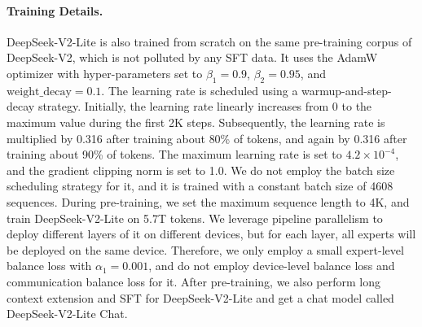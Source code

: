 \documentclass[11pt, a4paper, logo, copyright, nonumbering]{deepseek}
\newcommand{\dsvii}{DeepSeek-V2}
\newcommand{\dsviilite}{DeepSeek-V2-Lite}
\begin{document}
\begin{CJK*}{UTF8}{gbsn}
\paragraph{Training Details.}
\dsviilite{} is also trained from scratch on the same pre-training corpus of \dsvii{}, which is not polluted by any SFT data. 
It uses the AdamW optimizer with hyper-parameters set to $\beta_1=0.9$, $\beta_2=0.95$, and $\mathrm{weight\_decay}=0.1$. 
The learning rate is scheduled using a warmup-and-step-decay strategy. 
Initially, the learning rate linearly increases from 0 to the maximum value during the first 2K steps. 
Subsequently, the learning rate is multiplied by 0.316 after 
training about 80\% of tokens, and again by 0.316 after training about 90\% of tokens. 
The maximum learning rate is set to $4.2 \times 10^{-4}$, and the gradient clipping norm is set to 1.0.
We do not employ the batch size scheduling strategy for it, and it is trained with a constant batch size of 4608 sequences. 
During pre-training, we set the maximum sequence length to 4K, and train \dsviilite{} on 5.7T tokens. 
We leverage pipeline parallelism to deploy different layers of it on different devices, but for each layer, all experts will be deployed on the same device. 
Therefore, we only employ a small expert-level balance loss with $\alpha_{1}=0.001$, and do not employ device-level balance loss and communication balance loss for it. 
After pre-training, we also perform long context extension and SFT for \dsviilite{} and get a chat model called \dsviilite{} Chat.


\end{CJK*}
\end{document}
